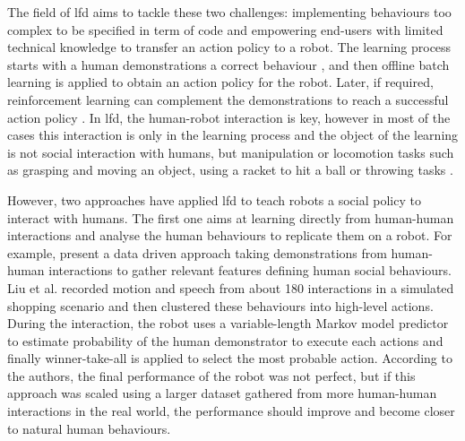 	    
	The field of \gls{lfd} aims to tackle these two challenges: implementing behaviours too complex to be specified in term of code and empowering end-users with limited technical knowledge to transfer an action policy to a robot. The learning process starts with a human demonstrations a correct behaviour \citep{argall2009survey}, and then offline batch learning is applied to obtain an action policy for the robot. Later, if required, reinforcement learning can complement the demonstrations to reach a successful action policy \citep{billard2008robot}.
	In \gls{lfd}, the human-robot interaction is key, however in most of the cases this interaction is only in the learning process and the object of the learning is not social interaction with humans, but manipulation or locomotion tasks such as grasping and moving an object, using a racket to hit a ball or throwing tasks \cite{billard2008robot}.
	
	However, two approaches have applied \gls{lfd} to teach robots a social policy to interact with humans.	The first one aims at learning directly from human-human interactions and analyse the human behaviours to replicate them on a robot. For example, \citet{liu2014train} present a data driven approach taking demonstrations from human-human interactions to gather relevant features defining human social behaviours. Liu et al. recorded motion and speech from about 180 interactions in a simulated shopping scenario and then clustered these behaviours into high-level actions. During the interaction, the robot uses a variable-length Markov model predictor to estimate probability of the human demonstrator to execute each actions and finally winner-take-all is applied to select the most probable action. According to the authors, the final performance of the robot was not perfect, but if this approach was scaled using a larger dataset gathered from more human-human interactions in the real world, the performance should improve and become closer to natural human behaviours.
    
